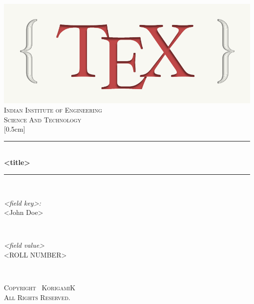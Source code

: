 \begin{titlepage}
    \center
    \includegraphics[scale=0.4]{images/logo.png}
    \vspace{1cm}
    \newcommand{\HRule}{\rule{\linewidth}{0.5mm}}
    \center
    \textsc{\LARGE Indian Institute of Engineering\\[0.2cm]
        Science And Technology}\\[0.25cm]
    [0.5cm] \textsc{}\\[0.4cm]
    \HRule \\[0.4cm]
    { \Large \bfseries <title>}\\[0.2cm]
    \HRule \\[0.5cm]
    \begin{center}
    \end{center}
    \begin{minipage}{0.45\textwidth}
        \begin{flushleft} \large
            \emph{<field key>:}\\
            <John Doe>
        \end{flushleft}
    \end{minipage}
    ~
    \begin{minipage}{0.45\textwidth}
        \begin{flushright} \large
            \emph{<field value>} \\
            <ROLL NUMBER>
        \end{flushright}
    \end{minipage}\\[1cm]
    \begin{center}

    \end{center}
    \begin{center}

    \end{center}
    \begin{center}
        \small\textsc{Copyright \textcopyright\, KorigamiK}\\
        \small\textsc{All Rights Reserved.}
    \end{center}
\end{titlepage}
\newpage